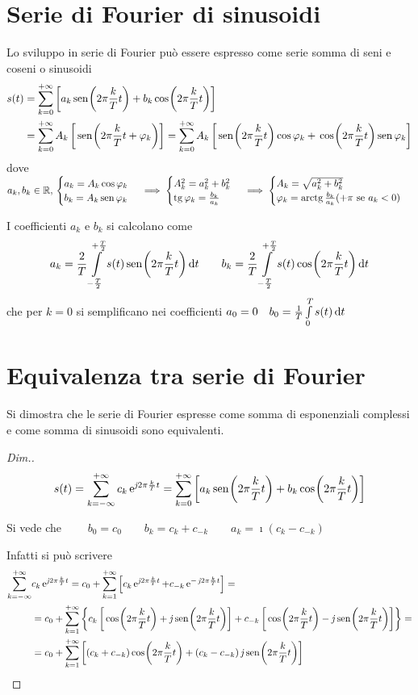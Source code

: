 \section{Serie di Fourier di sinusoidi}
Lo sviluppo in serie di Fourier può essere espresso come serie somma di seni e coseni o sinusoidi
\[\begin{split} s(t)&=\sum_{k=0}^{+\infty}\left[ a_k \,{\operatorname{sen}}^{}\!\left({2\pi\frac{k}{T}t}\right) + b_k \,{\operatorname{cos}}^{}\!\left({2\pi\frac{k}{T}t}\right)\right] \\
&=\sum_{k=0}^{+\infty}A_k\left[\,{\operatorname{sen}}^{}\!\left({2\pi\frac{k}{T}t+\varphi_k}\right)\right] =\sum_{k=0}^{+\infty}A_k\left[\,{\operatorname{sen}}^{}\!\left({2\pi\frac{k}{T}t}\right)\operatorname{cos}\varphi_k +\,{\operatorname{cos}}^{}\!\left({2\pi\frac{k}{T}t}\right)\operatorname{sen}\varphi_k \right]
\end{split}\]
dove $a_k,b_k \in\mathbb{R},\,\begin{cases}a_k=A_k\operatorname{cos}\varphi_k \\b_k=A_k\operatorname{sen}\varphi_k \end{cases}\implies\begin{cases}A_k^2=a_k^2+b_k^2\\ \operatorname{tg}\varphi_k=\frac{b_k}{a_k} \end{cases}\implies\begin{cases}A_k=\sqrt{a_k^2+b_k^2}\\ \varphi_k=\operatorname{arctg}\frac{b_k}{a_k} (+\pi\text{ se }a_k<0) \end{cases}$ 

I coefficienti $a_k$ e $b_k$ si calcolano come
\[a_k=\frac{2}{T}\int\limits_{-\frac{T}{2}}^{+\frac{T}{2}}{s(t)\,{\operatorname{sen}}^{}\!\left({2\pi\frac{k}{T}t}\right)}{\,\mathop{}\!\mathrm{d}{t}} \qquad b_k=\frac{2}{T}\int\limits_{-\frac{T}{2}}^{+\frac{T}{2}}{s(t)\,{\operatorname{cos}}^{}\!\left({2\pi\frac{k}{T}t}\right)}{\,\mathop{}\!\mathrm{d}{t}}\]
che per $k=0$ si semplificano nei coefficienti $a_0=0 \quad b_0=\frac{1}{T}\int\limits_{0}^{T}{s(t)}{\,\mathop{}\!\mathrm{d}{t}}$

\section{Equivalenza tra serie di Fourier}
Si dimostra che le serie di Fourier espresse come somma di esponenziali complessi e come somma di sinusoidi sono equivalenti.

\begin{proof}[Dim.]
\[s(t)=\sum_{k=-\infty}^{+\infty} c_k \operatorname{e}^{\operatorname{\mathit{j}\!} 2\pi\frac{k}{T}t} = \sum_{k=0}^{+\infty}\left[ a_k \,{\operatorname{sen}}^{}\!\left({2\pi\frac{k}{T}t}\right) + b_k \,{\operatorname{cos}}^{}\!\left({2\pi\frac{k}{T}t}\right)\right] 
\]

Si vede che $\qquad b_0=c_0 \qquad b_k=c_k+c_{-k} \qquad a_k=\imath (c_k-c_{-k})$

Infatti si può scrivere
\[\begin{split}\sum_{k=-\infty}^{+\infty} & c_k \e{\imath 2\pi\frac{k}{T}t} = c_0+ \sum_{k=1}^{+\infty} \left[ c_k \e{\imath 2\pi\frac{k}{T}t} + c_{-k} \e{-\imath 2\pi\frac{k}{T}t} \right] = \\
&= c_0 + \sum_{k=1}^{+\infty} {\left\lbrace c_k \left[\cos{2\pi\frac{k}{T}t}+\imath\sen{2\pi\frac{k}{T}t}\right]
+c_{-k}\left[\cos{2\pi\frac{k}{T}t}-\imath\sen{2\pi\frac{k}{T}t}\right] \right\rbrace}=\\
&= c_0 + \sum_{k=1}^{+\infty} {\left[(c_k+c_{-k}) \cos{2\pi\frac{k}{T}t}+
(c_k-c_{-k})\imath\sen{2\pi\frac{k}{T}t}\right] }\end{split}\]
\end{proof}


